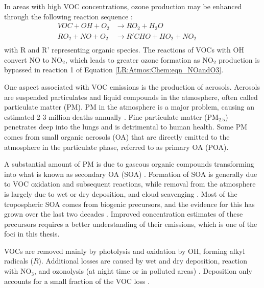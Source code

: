   
  In areas with high VOC concentrations, ozone production may be enhanced through the following reaction sequence \parencite{Sillman1999}:
  \begin{equation}
    \begin{aligned}
      VOC + OH + O_2   & \to RO_2 + H_2O       && \\%
      RO_2 + NO + O_2  & \to R'CHO+HO_2+NO_2   && \\%
    \end{aligned}
    \label{LR:VOCs:eqn_VOCandNO}
  \end{equation}
  with R and R' representing organic species.
  The reactions of VOCs with OH convert NO to NO$_2$, which leads to greater ozone formation as NO$_2$ production is bypassed in reaction 1 of Equation \ref{LR:Atmos:Chem:eqn_NOandO3}.
  
  One aspect associated with VOC emissions is the production of aerosols.
  Aerosols are suspended particulates and liquid compounds in the atmosphere, often called particulate matter (PM).
  PM in the atmosphere is a major problem, causing an estimated 2-3 million deaths annually \parencite{Avnery2011, Hoek2013, Krewski2009, Silva2013, Lelieveld2015}. 
  Fine particulate matter (PM$_{2.5}$) penetrates deep into the lungs and is detrimental to human health.
  Some PM comes from small organic aerosols (OA) that are directly emitted to the atmosphere in the particulate phase, referred to as primary OA (POA).
  
  A substantial amount of PM is due to gaseous organic compounds transforming into what is known as secondary OA (SOA) \parencite{Atkinson2000, Kanakidou2005, Kroll2008}.
  Formation of SOA is generally due to VOC oxidation and subsequent reactions, while removal from the atmosphere is largely due to wet or dry deposition, and cloud scavenging \parencite{Kanakidou2005}.
  Most of the tropospheric SOA comes from biogenic precursors, and the evidence for this has grown over the last two decades \parencite{Guenther1995, Kanakidou2005, Guenther2012}.
  Improved concentration estimates of these precursors requires a better understanding of their emissions, which is one of the foci in this thesis.
  
  VOCs are removed mainly by photolysis and oxidation by OH, forming alkyl radicals ($R\dot{}$).
  Additional losses are caused by wet and dry deposition, reaction with NO$_3$, and ozonolysis (at night time or in polluted areas) \parencite{AtkinsonArey2003, Brown2009}.
  Deposition only accounts for a small fraction of the VOC loss \parencite{AtkinsonArey2003}.
  
